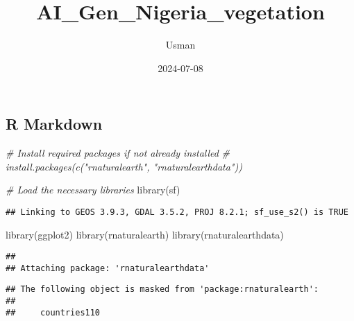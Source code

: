 \documentclass[
]{article}
\title{AI\_Gen\_Nigeria\_vegetation}
\author{Usman}
\date{2024-07-08}
\newenvironment{Shaded}{\begin{snugshade}}{\end{snugshade}}
\newcommand{\CommentTok}[1]{\textcolor[rgb]{0.56,0.35,0.01}{\textit{#1}}}
\newcommand{\FunctionTok}[1]{\textcolor[rgb]{0.00,0.00,0.00}{#1}}
\newcommand{\NormalTok}[1]{#1}
\begin{document}
\maketitle

\hypertarget{r-markdown}{%
\subsection{R Markdown}\label{r-markdown}}

\begin{Shaded}
\begin{Highlighting}[]
\CommentTok{\# Install required packages if not already installed}
\CommentTok{\# install.packages(c("rnaturalearth", "rnaturalearthdata"))}

\CommentTok{\# Load the necessary libraries}
\FunctionTok{library}\NormalTok{(sf)}
\end{Highlighting}
\end{Shaded}

\begin{verbatim}
## Linking to GEOS 3.9.3, GDAL 3.5.2, PROJ 8.2.1; sf_use_s2() is TRUE
\end{verbatim}

\begin{Shaded}
\begin{Highlighting}[]
\FunctionTok{library}\NormalTok{(ggplot2)}
\FunctionTok{library}\NormalTok{(rnaturalearth)}
\FunctionTok{library}\NormalTok{(rnaturalearthdata)}
\end{Highlighting}
\end{Shaded}

\begin{verbatim}
## 
## Attaching package: 'rnaturalearthdata'
\end{verbatim}

\begin{verbatim}
## The following object is masked from 'package:rnaturalearth':
## 
##     countries110
\end{verbatim}
\end{document}
